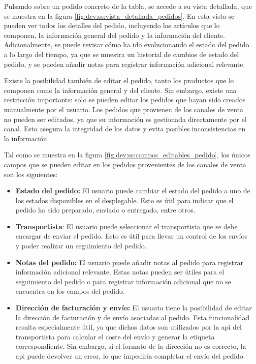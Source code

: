 Pulsando sobre un pedido concreto de la tabla, se accede a su vista detallada, que se muestra en la figura \ref{fig:dev:ss:vista_detallada_pedidos}. En esta vista se pueden ver todos los detalles del pedido, incluyendo los artículos que lo componen, la información general del pedido y la información del cliente. Adicionalmente, se puede revisar cómo ha ido evolucionando el estado del pedido a lo largo del tiempo, ya que se muestra un historial de cambios de estado del pedido, y se pueden añadir notas para registrar información adicional relevante.

Existe la posibilidad también de editar el pedido, tanto los productos que lo componen como la información general y del cliente. Sin embargo, existe una restricción importante: solo se pueden editar los pedidos que hayan sido creados manualmente por el usuario. Los pedidos que provienen de los canales de venta no pueden ser editados, ya que su información es gestionada directamente por el canal. Esto asegura la integridad de los datos y evita posibles inconsistencias en la información.

Tal como se muestra en la figura \ref{fig:dev:ss:campos_editables_pedido}, los únicos campos que se pueden editar en los pedidos provenientes de los canales de venta son los siguientes:

\begin{itemize}
    \item \textbf{Estado del pedido:} El usuario puede cambiar el estado del pedido a uno de los estados disponibles en el desplegable. Esto es útil para indicar que el pedido ha sido preparado, enviado o entregado, entre otros.
    \item \textbf{Transportista}: El usuario puede seleccionar el transportista que se debe encargar de enviar el pedido. Esto es útil para llevar un control de los envíos y poder realizar un seguimiento del pedido.
    \item \textbf{Notas del pedido:} El usuario puede añadir notas al pedido para registrar información adicional relevante. Estas notas pueden ser útiles para el seguimiento del pedido o para registrar información adicional que no se encuentra en los campos del pedido.
    \item \textbf{Dirección de facturación y envío:} El usuario tiene la posibilidad de editar la dirección de facturación y de envío asociadas al pedido. Esta funcionalidad resulta especialmente útil, ya que dichos datos son utilizados por la \gls{api} del transportista para calcular el coste del envío y generar la etiqueta correspondiente. Sin embargo, si el formato de la dirección no es correcto, la \gls{api} puede devolver un error, lo que impediría completar el envío del pedido.
\end{itemize}

